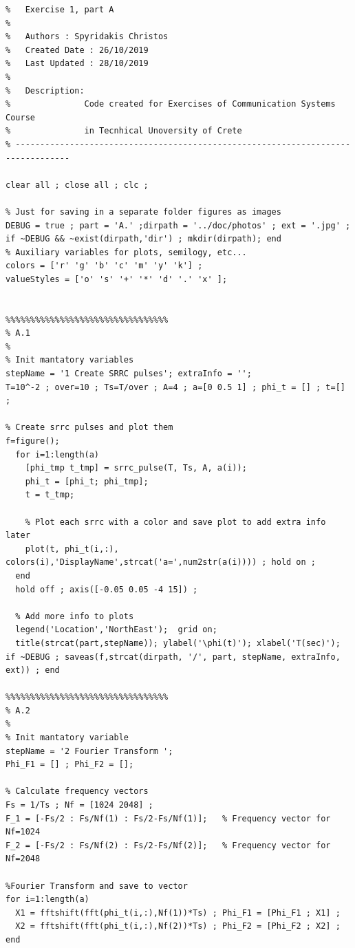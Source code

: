 \documentclass[11pt]{article}
\begin{document}
%
%
%
\begin{lstlisting}[caption = {\texttt{part\_a.m}}]
% ---------------------------------------------------------------------------------
%   Exercise 1, part A
%
%   Authors : Spyridakis Christos
%   Created Date : 26/10/2019
%   Last Updated : 28/10/2019
%
%   Description: 
%               Code created for Exercises of Communication Systems Course
%               in Tecnhical Unoversity of Crete
% ---------------------------------------------------------------------------------

clear all ; close all ; clc ;

% Just for saving in a separate folder figures as images
DEBUG = true ; part = 'A.' ;dirpath = '../doc/photos' ; ext = '.jpg' ; if ~DEBUG && ~exist(dirpath,'dir') ; mkdir(dirpath); end
% Auxiliary variables for plots, semilogy, etc...
colors = ['r' 'g' 'b' 'c' 'm' 'y' 'k'] ;
valueStyles = ['o' 's' '+' '*' 'd' '.' 'x' ];


%%%%%%%%%%%%%%%%%%%%%%%%%%%%%%%%%
% A.1
%
% Init mantatory variables
stepName = '1 Create SRRC pulses'; extraInfo = '';
T=10^-2 ; over=10 ; Ts=T/over ; A=4 ; a=[0 0.5 1] ; phi_t = [] ; t=[] ; 

% Create srrc pulses and plot them 
f=figure();
  for i=1:length(a)
    [phi_tmp t_tmp] = srrc_pulse(T, Ts, A, a(i));
    phi_t = [phi_t; phi_tmp];
    t = t_tmp;
    
    % Plot each srrc with a color and save plot to add extra info later  
    plot(t, phi_t(i,:), colors(i),'DisplayName',strcat('a=',num2str(a(i)))) ; hold on ; 
  end
  hold off ; axis([-0.05 0.05 -4 15]) ;

  % Add more info to plots                                           
  legend('Location','NorthEast');  grid on;
  title(strcat(part,stepName)); ylabel('\phi(t)'); xlabel('T(sec)');  
if ~DEBUG ; saveas(f,strcat(dirpath, '/', part, stepName, extraInfo, ext)) ; end 

%%%%%%%%%%%%%%%%%%%%%%%%%%%%%%%%%
% A.2
%
% Init mantatory variable 
stepName = '2 Fourier Transform ';
Phi_F1 = [] ; Phi_F2 = [];

% Calculate frequency vectors
Fs = 1/Ts ; Nf = [1024 2048] ;              
F_1 = [-Fs/2 : Fs/Nf(1) : Fs/2-Fs/Nf(1)];   % Frequency vector for Nf=1024
F_2 = [-Fs/2 : Fs/Nf(2) : Fs/2-Fs/Nf(2)];   % Frequency vector for Nf=2048

%Fourier Transform and save to vector
for i=1:length(a)
  X1 = fftshift(fft(phi_t(i,:),Nf(1))*Ts) ; Phi_F1 = [Phi_F1 ; X1] ;
  X2 = fftshift(fft(phi_t(i,:),Nf(2))*Ts) ; Phi_F2 = [Phi_F2 ; X2] ; 
end


\end{lstlisting}
\end{document}
